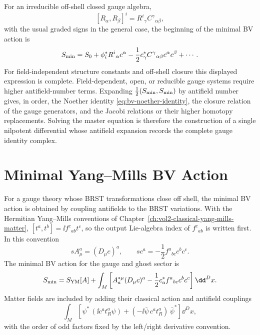 For an irreducible off-shell closed gauge algebra,
\[
  [R_\alpha,R_\beta]^i
  =
  R^i{}_\gamma C^\gamma{}_{\alpha\beta},
\]
with the usual graded signs in the general case, the beginning of the minimal
BV action is
\begin{equation}
  S_{\rm min}
  =
  S_0
  +
  \phi^*_iR^i{}_\alpha c^\alpha
  -
  \frac12 c^*_\gamma C^\gamma{}_{\alpha\beta}c^\alpha c^\beta
  +\cdots .
  \label{eq:bv-general-minimal-action}
\end{equation}
For field-independent structure constants and off-shell closure this displayed
expression is complete.  Field-dependent, open, or reducible gauge systems
require higher antifield-number terms.  Expanding
\(\frac12(S_{\rm min},S_{\rm min})\) by antifield number gives, in order,
the Noether identity \eqref{eq:bv-noether-identity}, the closure relation of
the gauge generators, and the Jacobi relations or their higher homotopy
replacements.  Solving the master equation is therefore the construction of a
single nilpotent differential whose antifield expansion records the complete
gauge identity complex.

\section{Minimal Yang--Mills BV Action}

For a gauge theory whose BRST transformations close off shell, the minimal BV
action is obtained by coupling antifields to the BRST variations.  With the
Hermitian Yang--Mills conventions of
Chapter~\ref{ch:vol2-classical-yang-mills-matter},
\([t^a,t^b]=\ii f^c{}_{ab}t^c\), so the output Lie-algebra index of
\(f^c{}_{ab}\) is written first.  In this convention
\[
  sA_\mu^a=(D_\mu c)^a,\qquad
  sc^a=-\frac12 f^a{}_{bc}c^b c^c .
\]
The minimal BV action for the gauge and ghost sector is
\begin{equation}
  S_{\rm min}
  =
  S_{\rm YM}[A]
  +
  \int_M
  \left[
  A^{*\mu}_a(D_\mu c)^a
  -
  \frac12 c^*_a f^a{}_{bc}c^b c^c
  \right]\dd^D x .
  \label{eq:minimal-yang-mills-bv-action}
\end{equation}
Matter fields are included by adding their classical action and antifield
couplings
\[
  \int_M
  \left[
  \psi^*\,(\ii c^a t_R^a\psi)
  +
  (-\ii\bar\psi\,c^a t_R^a)\,\bar\psi^*
  \right]\dd^D x ,
\]
with the order of odd factors fixed by the left/right derivative convention.

